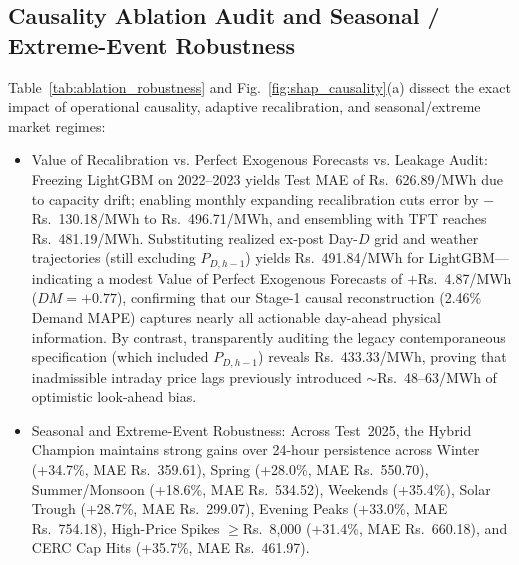 \documentclass[runningheads,a4paper]{llncs}
\begin{document}
\subsection{Causality Ablation Audit and Seasonal / Extreme-Event Robustness}
Table~\ref{tab:ablation_robustness} and Fig.~\ref{fig:shap_causality}(a) dissect the exact impact of operational causality, adaptive recalibration, and seasonal/extreme market regimes:
\begin{itemize}
    \item Value of Recalibration vs. Perfect Exogenous Forecasts vs. Leakage Audit: Freezing LightGBM on 2022--2023 yields Test MAE of Rs.~626.89/MWh due to capacity drift; enabling monthly expanding recalibration cuts error by $-$Rs.~130.18/MWh to Rs.~496.71/MWh, and ensembling with TFT reaches Rs.~481.19/MWh. Substituting realized ex-post Day-$D$ grid and weather trajectories (still excluding $P_{D,h-1}$) yields Rs.~491.84/MWh for LightGBM---indicating a modest Value of Perfect Exogenous Forecasts of $+$Rs.~4.87/MWh ($DM = +0.77$), confirming that our Stage-1 causal reconstruction (2.46\% Demand MAPE) captures nearly all actionable day-ahead physical information. By contrast, transparently auditing the legacy contemporaneous specification (which included $P_{D,h-1}$) reveals Rs.~433.33/MWh, proving that inadmissible intraday price lags previously introduced $\sim$Rs.~48--63/MWh of optimistic look-ahead bias.
    \item Seasonal and Extreme-Event Robustness: Across Test~2025, the Hybrid Champion maintains strong gains over 24-hour persistence across Winter (+34.7\%, MAE Rs.~359.61), Spring (+28.0\%, MAE Rs.~550.70), Summer/Monsoon (+18.6\%, MAE Rs.~534.52), Weekends (+35.4\%), Solar Trough (+28.7\%, MAE Rs.~299.07), Evening Peaks (+33.0\%, MAE Rs.~754.18), High-Price Spikes $\ge$Rs.~8,000 (+31.4\%, MAE Rs.~660.18), and CERC Cap Hits (+35.7\%, MAE Rs.~461.97).
\end{itemize}
\end{document}
